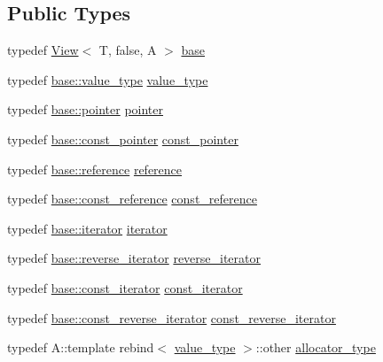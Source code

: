 \subsection*{Public Types}
\begin{DoxyCompactItemize}
\item 
typedef \hyperlink{classandres_1_1View}{View}$<$ T, false, A $>$ \hyperlink{classandres_1_1Marray_ad954a5c638124bd4cbfdedf8fed54f0c}{base}
\item 
typedef \hyperlink{classandres_1_1View_abe3d48ac2b0d65536e54dbfad0a44929}{base\+::value\+\_\+type} \hyperlink{classandres_1_1Marray_a902cba550c99fb1db7b6b95edb0ca4df}{value\+\_\+type}
\item 
typedef \hyperlink{classandres_1_1View_a9a201594c82be89fccd0fe644ea2f09c}{base\+::pointer} \hyperlink{classandres_1_1Marray_a42f16cbe0ebc93347dd9eed78484e951}{pointer}
\item 
typedef \hyperlink{classandres_1_1View_a947d02064bced23437b804a8050e6ccb}{base\+::const\+\_\+pointer} \hyperlink{classandres_1_1Marray_a6e9d79616cdeed14221d96431ab5f678}{const\+\_\+pointer}
\item 
typedef \hyperlink{classandres_1_1View_aebdd1f19272b743b4422ff8ba18fc11a}{base\+::reference} \hyperlink{classandres_1_1Marray_a20b76b3ff5480625dfad98caf0ec9649}{reference}
\item 
typedef \hyperlink{classandres_1_1View_a69e3d49e3d8242a33c03d42dd5ecc5b8}{base\+::const\+\_\+reference} \hyperlink{classandres_1_1Marray_ae5ecc2e9f1b747ffaaff04ab15568783}{const\+\_\+reference}
\item 
typedef \hyperlink{classandres_1_1View_aef54ee0a58e755b897398493d05a44df}{base\+::iterator} \hyperlink{classandres_1_1Marray_afa294c08fe2bf282f9c3b65ac8da1622}{iterator}
\item 
typedef \hyperlink{classandres_1_1View_aab07af42756759420211d114bb705547}{base\+::reverse\+\_\+iterator} \hyperlink{classandres_1_1Marray_a9125dfa109e0a43ccd18081fd64ed65e}{reverse\+\_\+iterator}
\item 
typedef \hyperlink{classandres_1_1View_a7b6f125a7b3830f30cd34887b61858a7}{base\+::const\+\_\+iterator} \hyperlink{classandres_1_1Marray_a0b3be7ebc2bd3a247b59a8ed7be24102}{const\+\_\+iterator}
\item 
typedef \hyperlink{classandres_1_1View_a61656971b73a48c8bf009e3200aad900}{base\+::const\+\_\+reverse\+\_\+iterator} \hyperlink{classandres_1_1Marray_a03aa08b455a9fcb7c3ba9072799cad92}{const\+\_\+reverse\+\_\+iterator}
\item 
typedef A\+::template rebind$<$ \hyperlink{classandres_1_1Marray_a902cba550c99fb1db7b6b95edb0ca4df}{value\+\_\+type} $>$\+::other \hyperlink{classandres_1_1Marray_a1e38873cb38bd8568be81bfb804deefd}{allocator\+\_\+type}
\end{DoxyCompactItemize}

